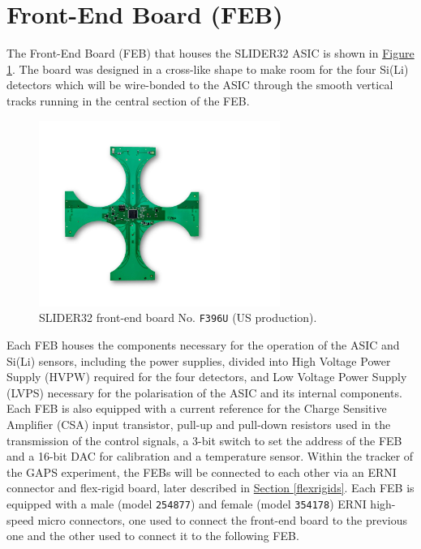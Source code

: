 
\section{Front-End Board (FEB)} \label{sec21}

\par
The Front-End Board (FEB) that houses the SLIDER32 ASIC is shown in \hyperref[figFEBimage]{Figure \ref{figFEBimage}}. The board was designed in a cross-like shape to make room for the four Si(Li) detectors which will be wire-bonded to the ASIC through the smooth vertical tracks running in the central section of the FEB.

\begin{figure}[ht]
    \centering
    \includegraphics[width=0.7\textwidth]{Images/chap2/FEB_immagine.pdf}
    \caption{SLIDER32 front-end board No. \texttt{F396U} (US production).}
    \label{figFEBimage}
\end{figure}

\par
Each FEB houses the components necessary for the operation of the ASIC and Si(Li) sensors, including the power supplies, divided into High Voltage Power Supply (HVPW) required for the four detectors, and Low Voltage Power Supply (LVPS) necessary for the polarisation of the ASIC and its internal components. Each FEB is also equipped with a current reference for the Charge Sensitive Amplifier (CSA) input transistor, pull-up and pull-down resistors used in the transmission of the control signals, a 3-bit switch to set the address of the FEB and a 16-bit DAC for calibration and a temperature sensor. Within the tracker of the GAPS experiment, the FEBs will be connected to each other via an ERNI connector and flex-rigid board, later described in \hyperref[flexrigids]{Section \ref{flexrigids}}. Each FEB is equipped with a male (model \texttt{254877}) and female (model \texttt{354178}) ERNI high-speed micro connectors, one used to connect the front-end board to the previous one and the other used to connect it to the following FEB.

